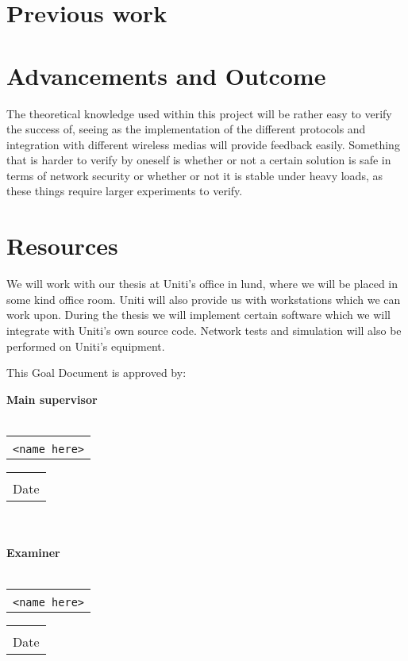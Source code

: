 \documentclass[a4paper]{article}
\makeatletter
\newcommand{\signature}[2]{%
	\noindent%
	\textbf{{#1}}\\\\
	\begin{tabular}{@{}p{2.5in}@{}}
		\\ \hline \\[-.75\normalbaselineskip]
		\texttt{{#2}}
	\end{tabular} \hspace{0in}
	\begin{tabular}{@{}p{2.5in}@{}}
		\\ \hline \\[-.75\normalbaselineskip]
		Date
	\end{tabular}\\
}
\makeatother
\begin{document}
\section{Previous work}



\section{Advancements and Outcome}
The theoretical knowledge used within this project will be rather easy
to verify the success of, seeing as the implementation of the different 
protocols and integration with different wireless medias will provide
feedback easily. Something that is harder to verify by oneself is whether
or not a certain solution is safe in terms of network security or whether
or not it is stable under heavy loads, as these things require larger
experiments to verify.

\section{Resources}
We will work with our thesis at Uniti's office in lund, where we will
be placed in some kind office room. Uniti will also provide us with
workstations which we can work upon. During the thesis we will 
implement certain software which we will integrate with Uniti's
own source code. Network tests and simulation will also be performed
on Uniti's equipment.


{}



This Goal Document is approved by:

\signature{Main supervisor}{<name here>}\\

\signature{Examiner}{<name here>}
\end{document}

